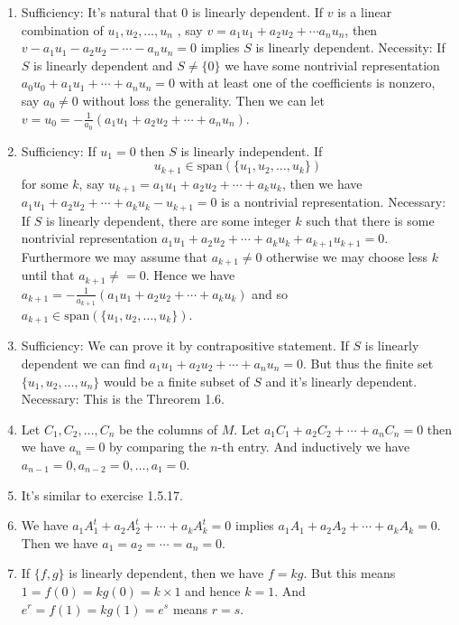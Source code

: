 \begin{enumerate}
\begin{enumerate}
\end{enumerate}
\item Sufficiency: It's natural that ${0}$ is linearly dependent. If $v$ is a linear combination of $u_1,u_2, \ldots ,u_n$ , say $v=a_1u_1+a_2u_2+\cdots a_nu_n$, then $v-a_1u_1-a_2u_2-\cdots -a_nu_n=0$ implies $S$ is linearly dependent. Necessity: If $S$ is linearly dependent and $S\neq\{0\}$ we have some nontrivial representation $a_0u_0+a_1u_1+\cdots +a_nu_n=0$ with at least one of the coefficients is nonzero, say $a_0\neq 0$ without loss the generality. Then we can let $v=u_0=-\frac{1}{a_0}(a_1u_1+a_2u_2+\cdots +a_nu_n)$.
\item Sufficiency: If $u_1=0$ then $S$ is linearly independent. If \[u_{k+1}\in \mathrm{span}(\{u_1,u_2,\ldots ,u_k\})\] for some $k$, say $u_{k+1}=a_1u_1+a_2u_2+\cdots +a_ku_k$, then we have $a_1u_1+a_2u_2+\cdots +a_ku_k-u_{k+1}=0$ is a nontrivial representation. Necessary: If $S$ is linearly dependent, there are some integer $k$ such that there is some nontrivial representation $a_1u_1+a_2u_2+\cdots +a_ku_k+a_{k+1}u_{k+1}=0$. Furthermore we may assume that $a_{k+1}\neq 0$ otherwise we may choose less $k$ until that $a_{k+1}\neq =0$. Hence we have $a_{k+1}=-\frac{1}{a_{k+1}}(a_1u_1+a_2u_2+\cdots +a_ku_k)$ and so $a_{k+1}\in \mathrm{span}(\{u_1,u_2,\ldots ,u_k\})$.
\item Sufficiency: We can prove it by contrapositive statement. If $S$ is linearly dependent we can find $a_1u_1+a_2u_2+\cdots +a_nu_n=0$. But thus the finite set $\{u_1,u_2,\ldots ,u_n\}$ would be a finite subset of $S$ and it's linearly dependent. Necessary: This is the Threorem 1.6.
\item Let $C_1,C_2, \ldots ,C_n$ be the columns of $M$. Let $a_1C_1+a_2C_2+\cdots +a_nC_n=0$ then we have $a_n=0$ by comparing the $n$-th entry. And inductively we have $a_{n-1}=0,a_{n-2}=0, \ldots , a_{1}=0$.
\item It's similar to exercise 1.5.17.
\item We have $a_1A_1^t+a_2A_2^t+\cdots +a_kA_k^t=0$ implies $a_1A_1+a_2A_2+\cdots +a_kA_k=0$. Then we have $a_1=a_2=\cdots =a_n=0$.
\item If $\{f,g\}$ is linearly dependent, then we have $f=kg$. But this means $1=f(0)=kg(0)=k\times 1$ and hence $k=1$. And $e^r=f(1)=kg(1)=e^s$ means $r=s$.
\end{enumerate}
